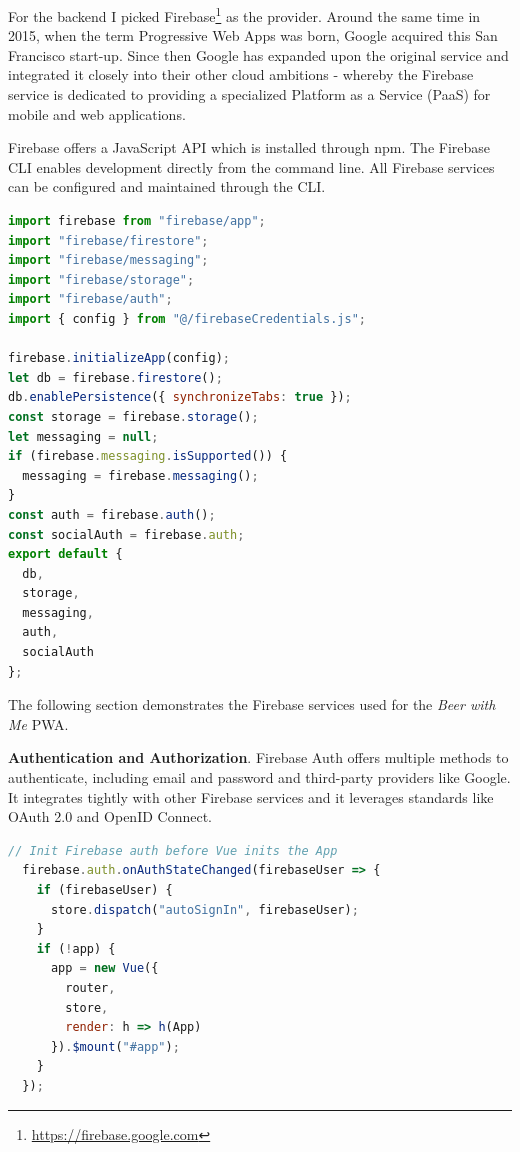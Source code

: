 For the backend I picked Firebase\footnote{\url{https://firebase.google.com}} as the provider. Around the same time in 2015, when the term Progressive Web Apps was born, Google acquired this San Francisco start-up. Since then Google has expanded upon the original service and integrated it closely into their other cloud ambitions - whereby the Firebase service is dedicated to providing a specialized Platform as a Service (PaaS) for mobile and web applications.

Firebase offers a JavaScript API which is installed through npm. The Firebase CLI enables development directly from the command line. All Firebase services can be configured and maintained through the CLI.

\begin{lstlisting}[language=JavaScript, caption=Firebase configuration and services (firebaseConfig.js), label=lst:firebase-conf]
import firebase from "firebase/app";
import "firebase/firestore";
import "firebase/messaging";
import "firebase/storage";
import "firebase/auth";
import { config } from "@/firebaseCredentials.js";

firebase.initializeApp(config);
let db = firebase.firestore();
db.enablePersistence({ synchronizeTabs: true });
const storage = firebase.storage();
let messaging = null;
if (firebase.messaging.isSupported()) {
  messaging = firebase.messaging();
}
const auth = firebase.auth();
const socialAuth = firebase.auth;
export default {
  db,
  storage,
  messaging,
  auth,
  socialAuth
};
\end{lstlisting}


The following section demonstrates the Firebase services used for the \textit{Beer with Me} PWA.

\textbf{Authentication and Authorization}. Firebase Auth offers multiple methods to authenticate, including email and password and third-party providers like Google. It integrates tightly with other Firebase services and it leverages standards like OAuth 2.0 and OpenID Connect.

\begin{lstlisting}[language=JavaScript, caption=Firebase Auth initiation using VueJS (main.js), label=lst:firebase-auth]
  // Init Firebase auth before Vue inits the App
  firebase.auth.onAuthStateChanged(firebaseUser => {
    if (firebaseUser) {
      store.dispatch("autoSignIn", firebaseUser);
    }
    if (!app) {
      app = new Vue({
        router,
        store,
        render: h => h(App)
      }).$mount("#app");
    }
  });
\end{lstlisting}


